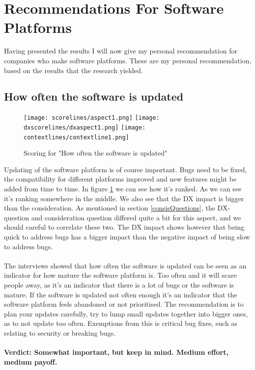 \documentclass{cslthse-msc}
\begin{document}
    \section{Recommendations For Software Platforms}\label{sec:recommendations}
    Having presented the results I will now give my personal recommendation for companies who make software platforms. These are my personal recommendation, based on the results that the research yielded.
    \subsection{How often the software is updated}
    \begin{figure}[H]
        \centering
        \texttt{[image: scorelines/aspect1.png]}
        \texttt{[image: dxscorelines/dxaspect1.png]}
        \texttt{[image: contextlines/contextline1.png]}
        \caption{Scoring for "How often the software is updated"}
        \label{fig:aspect1}
    \end{figure}
    Updating of the software platform is of course important. Bugs need to be fixed, the compatibility for different platforms improved and new features might be added from time to time. In figure \ref{fig:aspect1} we can see how it's ranked. As we can see it's ranking somewhere in the middle. We also see that the DX impact is bigger than the consideration. As mentioned in section \ref{consisQuestions}, the DX-question and consideration question differed quite a bit for this aspect, and we should careful to correlate these two. The DX impact shows however that being quick to address bugs has a bigger impact than the negative impact of being slow to address bugs.\\ \\The interviews showed that how often the software is updated can be seen as an indicator for how mature the software platform is. Too often and it will scare people away, as it's an indicator that there is a lot of bugs or the software is mature. If the software is updated not often enough it's an indicator that the software platform feels abandoned or not prioritised. The recommendation is to plan your updates carefully, try to lump small updates together into bigger ones, as to not update too often. Exemptions from this is critical bug fixes, such as relating to security or breaking bugs.\\ \\
    \textbf{Verdict: Somewhat important, but keep in mind. Medium effort, medium payoff.}
\end{document}
